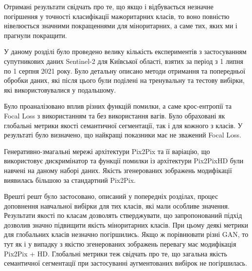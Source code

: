 Отримані результати свідчать про те, що якщо і відбувається незначне
погіршення у точності класифікації мажоритарних класів, то воно повністю
нівелюється значними покращеннями для міноритарних, а саме тих,
яких ми і прагнули покращити.

\chapconclude{\ref{chap:practice}}

У даному розділі було проведено велику кількість експериментів
з застосуванням супутникових даних Sentinel-2 для Київської області,
взятих за період з 1 липня по 1 серпня 2021 року. Було детальну
описано методи отримання та попередньої обробки даних, які
після цього були поділені на тренувальну та тестову вибірки, які
використовувалися у подальшому.

Було проаналізовано вплив різних функцій помилки, а саме
крос-ентропії та Focal Loss з використанням та без використання вагів.
Було обраховані як глобальні метрики якості семантичної сегментації, так
і для кожного з класів. У результаті було визначено, що
найкращі показники має не зважений Focal Loss.

Генеративно-змагальні мережі архітектури Pix2Pix та її варіацію, що
використовує дискримінатор та функції помилки із архітектури Pix2PixHD
були навчені на даному наборі даних. Якість згенерованих зображень
модифікації виявилась більшою за стандартний Pix2Pix.

Врешті решт було застосовано, описаний у попередніх розділах,
процес доповнення навчальної вибірки для тих класів, які
мали особливе значення. Результати якості по класам дозволять стверджувати,
що запропонований підхід дозволив значно підвищити якість
міноритарних класів. При цьому деякі метрики для глобальних класів незначно
погіршились. Якщо ж порівнювати різні GAN, то тут як і у випадку з
якістю згенерованих зображень перевагу має модифікація Pix2Pix + HD.
Глобальні метрики теж свідчать про те, що загальна якість
семантичної сегментації при застосуванні аугментованих вибірок
не погіршилась.
